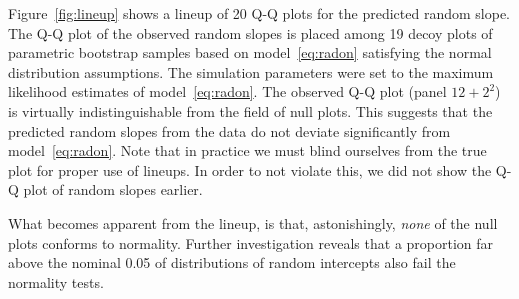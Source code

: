 \documentclass[12pt]{article} %
\begin{document}
Figure~\ref{fig:lineup} shows a lineup \citep{buja:2009} of 20 Q-Q plots for the predicted random slope. The Q-Q plot of the observed random slopes is placed among 19 decoy plots of parametric bootstrap samples based on model~\eqref{eq:radon} satisfying the normal distribution assumptions. The simulation parameters were set to the maximum likelihood estimates of model~\eqref{eq:radon}.
The observed Q-Q plot (panel $12+2^2$) is virtually indistinguishable from the field of null plots. This suggests that the predicted random slopes  from the data do not deviate significantly from model~\eqref{eq:radon}. 
Note that in practice we must blind ourselves from the true plot for proper use of lineups. In order to not violate this, we did not show the Q-Q plot of random slopes earlier.
%
%

What becomes apparent from the lineup, is that, astonishingly, {\it none} of the null plots conforms to normality. Further investigation  reveals  that a  proportion far above the nominal 0.05 of distributions of random intercepts also fail the normality tests.


\end{document}
